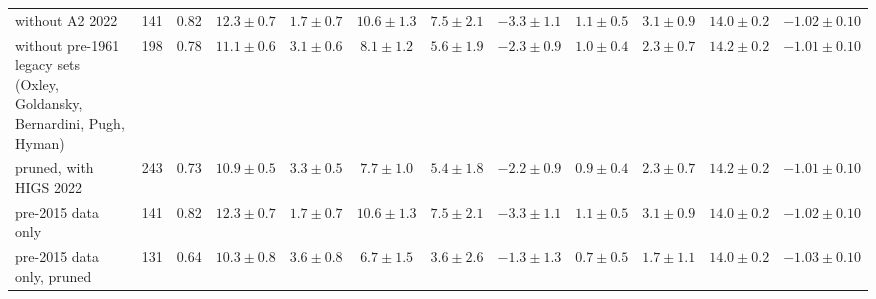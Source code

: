 \begin{tabular}{l r c cccc ccc cc}
without A2 2022 & 141 & 0.82 & $12.3\pm0.7$ & $1.7\pm0.7$ & $10.6\pm1.3$ & $7.5\pm2.1$ & $-3.3\pm1.1$ & $1.1\pm0.5$ & $3.1\pm0.9$ & $14.0\pm0.2$ & $-1.02\pm0.10$\\
without pre-1961 legacy sets (Oxley, Goldansky, Bernardini, Pugh, Hyman) & 198 & 0.78 & $11.1\pm0.6$ & $3.1\pm0.6$ & $8.1\pm1.2$ & $5.6\pm1.9$ & $-2.3\pm0.9$ & $1.0\pm0.4$ & $2.3\pm0.7$ & $14.2\pm0.2$ & $-1.01\pm0.10$\\
pruned, with HIGS 2022 & 243 & 0.73 & $10.9\pm0.5$ & $3.3\pm0.5$ & $7.7\pm1.0$ & $5.4\pm1.8$ & $-2.2\pm0.9$ & $0.9\pm0.4$ & $2.3\pm0.7$ & $14.2\pm0.2$ & $-1.01\pm0.10$\\
pre-2015 data only & 141 & 0.82 & $12.3\pm0.7$ & $1.7\pm0.7$ & $10.6\pm1.3$ & $7.5\pm2.1$ & $-3.3\pm1.1$ & $1.1\pm0.5$ & $3.1\pm0.9$ & $14.0\pm0.2$ & $-1.02\pm0.10$\\
pre-2015 data only, pruned & 131 & 0.64 & $10.3\pm0.8$ & $3.6\pm0.8$ & $6.7\pm1.5$ & $3.6\pm2.6$ & $-1.3\pm1.3$ & $0.7\pm0.5$ & $1.7\pm1.1$ & $14.0\pm0.2$ & $-1.03\pm0.10$\\
\hline
\end{tabular}

